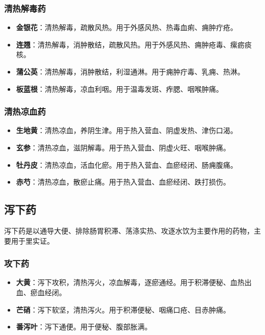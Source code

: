 \documentclass[12pt,UTF8]{ctexbook}
\begin{document}
\subsubsection{清热解毒药}

\begin{itemize}
\item \textbf{金银花}：清热解毒，疏散风热。用于外感风热、热毒血痢、痈肿疔疮。
\item \textbf{连翘}：清热解毒，消肿散结，疏散风热。用于外感风热、痈肿疮毒、瘰疬痰核。
\item \textbf{蒲公英}：清热解毒，消肿散结，利湿通淋。用于痈肿疔毒、乳痈、热淋。
\item \textbf{板蓝根}：清热解毒，凉血利咽。用于温毒发斑、痄腮、咽喉肿痛。
\end{itemize}

\subsubsection{清热凉血药}

\begin{itemize}
\item \textbf{生地黄}：清热凉血，养阴生津。用于热入营血、阴虚发热、津伤口渴。
\item \textbf{玄参}：清热凉血，滋阴解毒。用于热入营血、阴虚火旺、咽喉肿痛。
\item \textbf{牡丹皮}：清热凉血，活血化瘀。用于热入营血、血瘀经闭、肠痈腹痛。
\item \textbf{赤芍}：清热凉血，散瘀止痛。用于热入营血、血瘀经闭、跌打损伤。
\end{itemize}

\subsection{泻下药}

泻下药是以通导大便、排除肠胃积滞、荡涤实热、攻逐水饮为主要作用的药物，主要用于里实证。

\subsubsection{攻下药}

\begin{itemize}
\item \textbf{大黄}：泻下攻积，清热泻火，凉血解毒，逐瘀通经。用于积滞便秘、血热出血、瘀血经闭。
\item \textbf{芒硝}：泻下软坚，清热泻火。用于积滞便秘、咽痛口疮、目赤肿痛。
\item \textbf{番泻叶}：泻下通便。用于便秘、腹部胀满。
\end{itemize}
\end{document}
